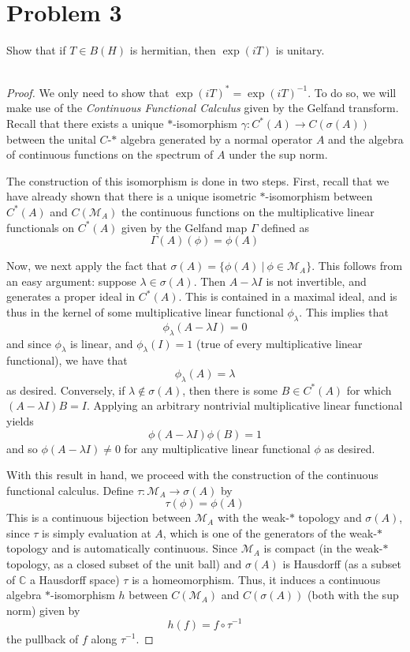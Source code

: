 \documentclass[fontsize=11pt]{scrartcl} %
\numberwithin{equation}{section} %
\numberwithin{figure}{section} %
\numberwithin{table}{section} %
\newcommand{\C}{\mathbb{C}}
\begin{document}
\section*{Problem 3}
Show that if $T\in B(H)$ is hermitian, then $\exp(iT)$ is unitary.
\\
\\
\begin{proof}
    We only need to show that $\exp(iT)^* = \exp(iT)^{-1}$. To do so, we will
    make use of the {\em Continuous Functional Calculus} given by the Gelfand
    transform. Recall that there exists a unique $*$-isomorphism $\gamma:
    C^*(A)\to C(\sigma(A))$ between the unital $C$-$*$ algebra generated by a
    normal operator $A$ and the algebra of continuous functions on the spectrum
    of $A$ under the sup norm.

    The construction of this isomorphism is done in two steps. First, recall
    that we have already shown that there is a unique isometric $*$-isomorphism
    between $C^*(A)$ and $C(\mathscr{M}_A)$ the continuous functions on the
    multiplicative linear functionals on $C^*(A)$ given by the Gelfand map $\Gamma$
    defined as
    \[
        \Gamma(A)(\phi) = \phi(A)
    \]
    
    Now, we next apply the fact that $\sigma(A) = \{\phi(A)\ |\ \phi\in
    \mathscr{M}_A\}$. This follows from an easy argument: suppose
    $\lambda\in\sigma(A)$. Then $A-\lambda I$ is not invertible, and generates
    a proper ideal in $C^*(A)$. This is contained in a maximal ideal, and is
    thus in the kernel of some multiplicative linear functional
    $\phi_{\lambda}$. This implies that
    \[
        \phi_{\lambda}(A-\lambda I) = 0
    \]
    and since $\phi_{\lambda}$ is linear, and $\phi_{\lambda}(I)=1$ (true of
    every multiplicative linear functional), we have that
    \[
        \phi_{\lambda}(A) = \lambda
    \]
    as desired. Conversely, if $\lambda\not\in\sigma(A)$, then there is some
    $B\in C^*(A)$ for which $(A-\lambda I)B =I$. Applying an arbitrary
    nontrivial multiplicative linear functional yields
    \[
        \phi(A-\lambda I)\phi(B) = 1
    \]
    and so $\phi(A-\lambda I)\neq 0$ for any multiplicative linear functional
    $\phi$ as desired.

    With this result in hand, we proceed with the construction of the continuous
    functional calculus. Define $\tau:\mathscr{M}_A\to \sigma(A)$ by
    \[
        \tau(\phi) = \phi(A)
    \]
    This is a continuous bijection between $\mathscr{M}_A$ with the weak-$*$
    topology and $\sigma(A)$, since $\tau$ is simply evaluation at $A$, which is
    one of the generators of the weak-$*$ topology and is automatically
    continuous.
    Since $\mathscr{M}_A$ is compact (in the weak-$*$ topology, as a closed
    subset of the unit ball) and $\sigma(A)$ is Hausdorff (as a subset of $\C$ a
    Hausdorff space) $\tau$ is a homeomorphism. Thus, it induces a continuous algebra
    $*$-isomorphism $h$ between $C(\mathscr{M}_A)$ and $C(\sigma(A))$ (both with
    the sup norm) given by
    \[
        h(f) = f\circ\tau^{-1}
    \]
    the pullback of $f$ along $\tau^{-1}$.


\end{proof}
\end{document}
